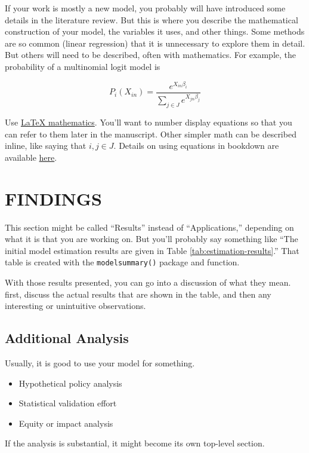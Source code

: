 \documentclass[3p, authoryear]{elsarticle} %
\providecommand{\tightlist}{%
  \setlength{\itemsep}{0pt}\setlength{\parskip}{0pt}}
\begin{document}
If your work is mostly a new model, you probably will have introduced some
details in the literature review. But this is where you describe the
mathematical construction of your model, the variables it uses, and other
things. Some methods are so common (linear regression) that it is unnecessary to
explore them in detail. But others will need to be described, often with
mathematics. For example, the probability of a multinomial logit model is

\begin{equation}
  P_i(X_{in}) = \frac{e^{X_{in}\beta_i}}{\sum_{j \in J}e^{X_{jn}\beta_j}}
  \label{eq:mnl}
\end{equation}

Use \href{https://www.overleaf.com/learn/latex/mathematical_expressions}{LaTeX mathematics}.
You'll want to number display equations so that you can
refer to them later in the manuscript. Other simpler math can be described inline,
like saying that \(i, j \in J\). Details on using equations in bookdown are available
\href{https://bookdown.org/yihui/bookdown/markdown-extensions-by-bookdown.html}{here}.

\hypertarget{findings}{%
\section{FINDINGS}\label{findings}}

This section might be called ``Results'' instead of ``Applications,'' depending
on what it is that you are working on. But you'll probably say something like
``The initial model estimation results are given in Table \ref{tab:estimation-results}.''
That table is created with the \texttt{modelsummary()} package and function.

With those results presented, you can go into a discussion of what they mean.
first, discuss the actual results that are shown in the table, and then any
interesting or unintuitive observations.

\hypertarget{additional-analysis}{%
\subsection{Additional Analysis}\label{additional-analysis}}

Usually, it is good to use your model for something.

\begin{itemize}
\tightlist
\item
  Hypothetical policy analysis
\item
  Statistical validation effort
\item
  Equity or impact analysis
\end{itemize}

If the analysis is substantial, it might become its own top-level section.


\end{document}
